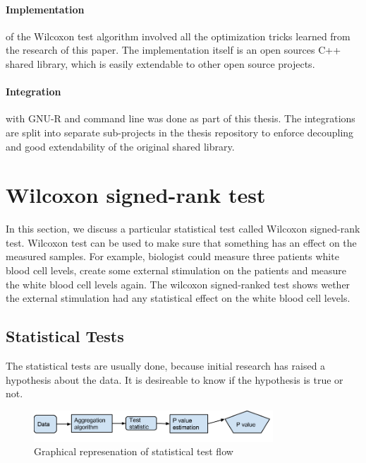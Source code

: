 \documentclass[12pt]{article}
\begin{document}
\paragraph{Implementation} of the Wilcoxon test algorithm involved all the optimization tricks learned from the research of this paper. The implementation itself is an open sources C++ shared library, which is easily extendable to other open source projects.

\paragraph{Integration} with GNU-R and command line was done as part of this thesis. The integrations are split into separate sub-projects in the thesis repository to enforce decoupling and good extendability of the original shared library.

\newpage

\section{Wilcoxon signed-rank test}

In this section, we discuss a particular statistical test called Wilcoxon signed-rank test. Wilcoxon test can be used to make sure that something has an effect on the measured samples. For example, biologist could measure three patients white blood cell levels, create some external stimulation on the patients and measure the white blood cell levels again. The wilcoxon signed-ranked test shows wether the external stimulation had any statistical effect on the white blood cell levels.
\subsection{Statistical Tests}

The statistical tests are usually done, because initial research has raised a hypothesis about the data. It is desireable to know if the hypothesis is true or not.

\begin{figure}[H]
  \centering
  \includegraphics[width=0.8\textwidth]{statisticalTestFlow}
  \caption{Graphical represenation of statistical test flow}
  \label{fig:statisticalTestFlow}
\end{figure}
\end{document}
